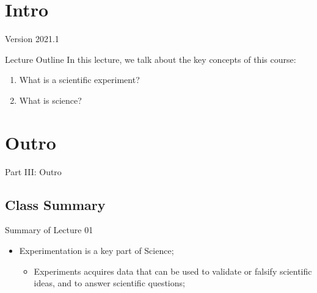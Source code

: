 \documentclass[aspectratio=169]{beamer}
\subtitle[Experimentalism]{Topic 01 - What is an experiment?}
\date{2023-04-14}
\begin{document}
\begin{CJK}{UTF8}{ipxm}

\section{Intro}
\begin{frame}
  \maketitle

  \vfill

  \hfill Version 2021.1
\end{frame}

\begin{frame}{Lecture Outline}
  In this lecture, we talk about the key concepts of this course:\bigskip

  \begin{enumerate}
    \item What is a scientific experiment?\bigskip

    \item What is science?
  \end{enumerate}
\end{frame}




\section{Outro}

\begin{frame}
  \begin{center}
    Part III: Outro
  \end{center}
\end{frame}

\subsection{Class Summary}
\begin{frame}{Summary of Lecture 01}
  \begin{itemize}
    \item Experimentation is a key part of Science;
    \begin{itemize}
      \item Experiments acquires data that can be used to validate or falsify scientific ideas, and to answer scientific questions;
    \end{itemize}
    \bigskip


\end{itemize}
\end{frame}
\end{CJK}
\end{document}
